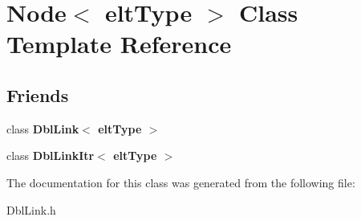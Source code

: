 \hypertarget{classNode}{\section{Node$<$ elt\-Type $>$ Class Template Reference}
\label{classNode}
}
\subsection*{Friends}
\begin{DoxyCompactItemize}
\item 
\hypertarget{classNode_a633d28fd34fd4343a6788b6eeb70f18f}{class {\bfseries Dbl\-Link$<$ elt\-Type $>$}}\label{classNode_a633d28fd34fd4343a6788b6eeb70f18f}

\item 
\hypertarget{classNode_a15e9b1e37fae72414617320686b8b4f0}{class {\bfseries Dbl\-Link\-Itr$<$ elt\-Type $>$}}\label{classNode_a15e9b1e37fae72414617320686b8b4f0}

\end{DoxyCompactItemize}


The documentation for this class was generated from the following file\-:\begin{DoxyCompactItemize}
\item 
Dbl\-Link.\-h\end{DoxyCompactItemize}
